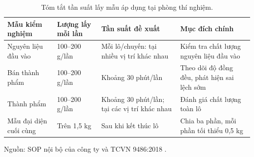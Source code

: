 \begin{table}[H]
  \centering
  \caption{Tóm tắt tần suất lấy mẫu áp dụng tại phòng thí nghiệm.}
  \label{tab:sampling-frequency}
  \begin{tabular}{p{} p{} p{} p{}}
    \toprule
    Mẫu kiểm nghiệm & Lượng lấy mỗi lần & Tần suất đề xuất & Mục đích chính \\
    \midrule
    Nguyên liệu đầu vào & 100--200 g/lần & Mỗi lô/chuyến: tại nhiều vị trí khác nhau & Kiểm tra chất lượng nguyên liệu đầu vào\\
    Bán thành phẩm & 100--200 g/lần & Khoảng 30 phút/lần & Theo dõi độ đồng đều, phát hiện sai lệch sớm \\
    Thành phẩm & 100--200 g/lần & Khoảng 30 phút/lần; tại các vị trí khác nhau & Đánh giá chất lượng toàn lô \\
    Mẫu đại diện cuối cùng & Trên 1,5 kg & Sau khi kết thúc lô & Chia ba phần, mỗi phần tối thiểu 0,5 kg \\
    \bottomrule
  \end{tabular}
  \par\smallskip
  \small Nguồn: SOP nội bộ của công ty và TCVN 9486:2018 \cite{company-internal-documents,tcvn9486-sampling}.
\end{table}
